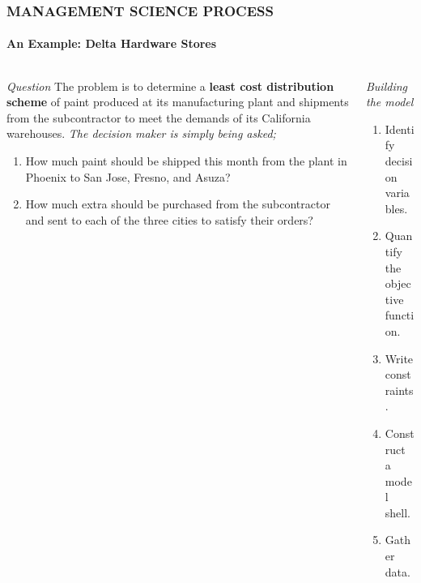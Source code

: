 \documentclass[14 pt]{beamer}
\begin{document}

\begin{frame}[t]
\frametitle{MANAGEMENT SCIENCE PROCESS}
\framesubtitle{An Example: Delta Hardware Stores}

\begin{columns}[t]
\begin{column}{0.45\textwidth}
\emph{Question}
\vskip0.5cm%
The problem is to determine a \textbf{least cost distribution scheme} of paint produced at its manufacturing plant and shipments from the subcontractor to meet the demands of its California warehouses.
\vskip0.5cm%
\emph{The decision maker is simply being asked;}
\begin{enumerate}
  \item How much paint should be shipped this month from the plant in Phoenix to San Jose, Fresno, and Asuza?
  \item How much extra should be purchased from the subcontractor and sent to each of the three cities to satisfy their orders?
\end{enumerate}
\end{column}

\begin{column}{0.45\textwidth}
\emph{Building the model}
\vskip0.5cm%
\begin{enumerate}
  \item Identify decision variables.
  \item Quantify the objective function.
  \item Write constraints.
  \item Construct a model shell.
  \item Gather data.
\end{enumerate}

\end{column}
\end{columns}
\end{frame}

\end{document}
